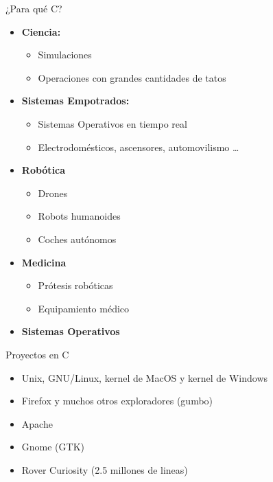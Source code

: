 \documentclass{mybeamer}
\begin{document}
\begin{framesec}{¿Para qué C?}
	\begin{itemize}
		\item \textbf{Ciencia:}
		\begin{itemize}
			\item Simulaciones
			\item Operaciones con grandes cantidades de tatos
		\end{itemize}
		\item \textbf{Sistemas Empotrados:}
		\begin{itemize}
			\item Sistemas Operativos en tiempo real
			\item Electrodomésticos, ascensores, automovilismo \ldots
		\end{itemize}
		\item \textbf{Robótica}
		\begin{itemize}
			\item Drones
			\item Robots humanoides
			\item Coches autónomos
		\end{itemize}
		\item \textbf{Medicina}
		\begin{itemize}
			\item Prótesis robóticas
			\item Equipamiento médico
		\end{itemize}
		\item \textbf{Sistemas Operativos}
	\end{itemize}
\end{framesec}

\begin{framesubsec}{Proyectos en C}
	\begin{itemize}
		\item Unix, GNU/Linux, kernel de MacOS y kernel de Windows
		\item Firefox y muchos otros exploradores (gumbo)
		\item Apache
		\item Gnome (GTK)
		\item Rover Curiosity (2.5 millones de lineas)
	\end{itemize}
\end{framesubsec}
\end{document}
